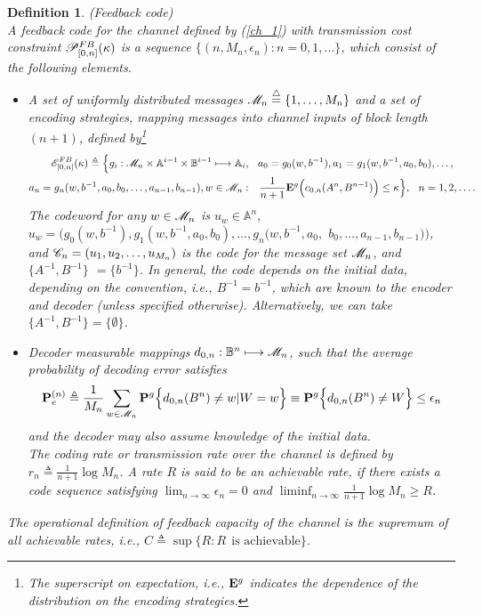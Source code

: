 \documentclass[11pt, a4paper, journal,onecolumn]{IEEEtran}
\newcommand{\mb}{\mathbb}
\newcommand{\sr}{\stackrel}
\newcommand{\tri}{\sr{\triangle}{=}}
\newcommand{\hso}{\hspace{.1in}}
\newtheorem{definition}{Definition}[section]
\begin{document}
\begin{definition}(Feedback code) \label{def_feedback_code}\\
A feedback code for the channel defined by (\ref{ch_1}) with  transmission cost constraint ${\cal P}_{[0,n]}^{FB}(\kappa)$  is a sequence   $\{(n, { M}_n, \epsilon_n):n=0, 1, \dots\}$, which consist of the following elements.  
\begin{itemize}
\item[(a)] A set of uniformly distributed messages ${\cal M}_n \tri \{ 1,  \ldots, M_n\}$ and a set of encoding strategies,  mapping messages  into channel inputs of block length $(n+1)$, defined by\footnote{The superscript on expectation, i.e., ${\bf E}^g$ indicates the dependence of the distribution on the encoding strategies.} 
\begin{multline}\label{block-code-nf-non}
{\cal E}_{[0,n]}^{FB}(\kappa) \triangleq  \Big\{g_i: {\cal M}_n \times {\mathbb A}^{i-1} \times {\mb B}^{i-1}  \longmapsto {\mb A}_i, \hso  a_0=g_0(w, b^{-1}), a_1=g_1(w,b^{-1},a_0,b_0),\ldots, \\ a_n=g_n(w,b^{-1},a_0,b_0,\ldots, a_{n-1}, b_{n-1}), 
  w\in {\cal M}_n: \hso  \frac{1}{n+1} {\bf E}^g\Big(c_{0,n}(A^n,B^{n-1})\Big)\leq \kappa  \Big\}, \hso n=1,2, \ldots. 
\end{multline}
The codeword for any $w \in {\cal M}_n$  is $u_w\in{\mb A}^n$, $u_w=(g_0(w,b^{-1}), g_1(w, b^{-1}, a_0, b_0),\dots,g_n(w, b^{-1},a_0, $ $b_0,\ldots, a_{n-1}, b_{n-1}))$, and ${\cal C}_n=( u_1,u_2,\dots,u_{{M}_n})$ is  the code for the message set ${\cal M}_n$, and $\{A^{-1}, B^{-1}\}$ $=\{b^{-1}\}$.  In general, the code  depends on the initial data, depending on the convention, i.e.,  $B^{-1}=b^{-1}$, which are known to the encoder and decoder (unless specified otherwise). Alternatively, we can take $\{A^{-1}, B^{-1}\}=\{\emptyset\}$.
\item[(b)] Decoder measurable mappings $d_{0,n}:{\mb B}^n\longmapsto {\cal M}_n$,  such that the average
probability of decoding error satisfies
\begin{align}
{\bf P}_e^{(n)} \triangleq \frac{1}{M_n} \sum_{w \in {\cal M}_n} {\bf  P}^g \Big\{d_{0,n}(B^{n}) \neq w |  W=w\Big\}\equiv {\bf  P}^g\Big\{d_{0,n}(B^n) \neq W \Big\} \leq \epsilon_n\nonumber
\end{align}
and the decoder may also assume knowledge of the initial data.\\
The coding rate or transmission rate over the channel is defined by  $r_n\triangleq \frac{1}{n+1} \log M_n$.
A rate $R$ is said to be an achievable rate, if there exists  a  code sequence satisfying
$\lim_{n\longrightarrow\infty} {\epsilon}_n=0$ and $\liminf_{n \longrightarrow\infty}\frac{1}{n+1}\log{{M}_n}\geq R$. 
\end{itemize}
The operational definition of feedback capacity of the channel is the supremum of all achievable rates, i.e., $C\triangleq \sup \{R: R \: \: \mbox{is achievable}\}$.\\
\end{definition}
\end{document}
